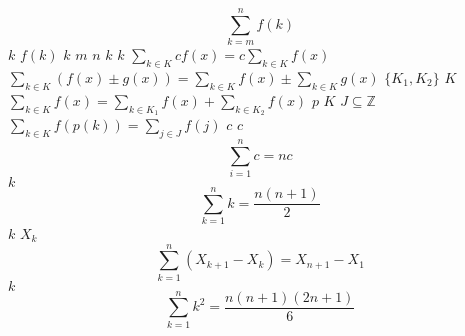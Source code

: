 \documentclass{article}
\begin{document}
$$
\sum_{k=m}^{n}{f(k)}
$$
$k$
$f(k)$
$k$
$m$
$n$
$k$
$k$
$\displaystyle \sum_{k \in K}{c f(x)} = c\sum_{k \in K}{f(x)}$
$\displaystyle \sum_{k \in K}{(f(x) \pm g(x))} = \sum_{k \in K}{f(x)} \pm \sum_{k \in K}{g(x)}$
$\{K_1, K_2\}$
$K$
$\displaystyle \sum_{k \in K}{f(x)} = \sum_{k \in K_1}{f(x)} + \sum_{k \in K_2}{f(x)}$
$p$
$K$
$J \subseteq \mathbb{Z}$
$\sum_{k \in K}{f(p(k))} = \sum_{j \in J}{f(j)}$
$c$
$c$
$$
\sum_{i=1}^{n}{c} = nc
$$
$k$
$$
\sum_{k=1}^{n}{k} = \frac{n(n+1)}{2}
$$
$k$
$X_k$
$$
\sum_{k=1}^{n}{(X_{k+1} - X_k)} = X_{n+1} - X_1
$$
$k$
$$
\sum_{k=1}^{n}{k^2} = \frac{n(n+1)(2n+1)}{6}
$$
\end{document}
